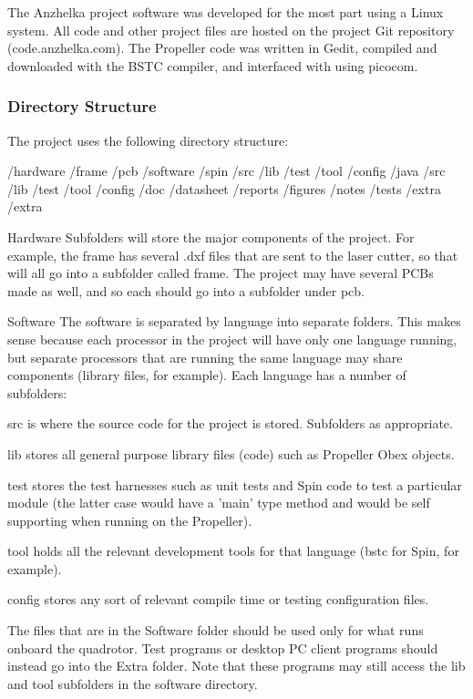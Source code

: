 \documentclass{article}
\numberwithin{equation}{section} %
\begin{document}
The Anzhelka project software was developed for the most part using a Linux system. All code and other project files are hosted on the project Git repository (code.anzhelka.com). The Propeller code was written in Gedit, compiled and downloaded with the BSTC compiler, and interfaced with using picocom.

\subsubsection{Directory Structure}

The project uses the following directory structure:

 /hardware 
    /frame 
    /pcb 
 /software 
    /spin 
       /src 
       /lib 
       /test 
       /tool 
       /config 
    /java 
       /src 
       /lib 
       /test 
       /tool 
       /config 
 /doc 
    /datasheet 
    /reports 
    /figures 
    /notes 
    /tests 
    /extra 
 /extra 
 
Hardware
Subfolders will store the major components of the project. For example, the frame has several .dxf files that are sent to the laser cutter, so that will all go into a subfolder called frame. The project may have several PCBs made as well, and so each should go into a subfolder under pcb. 

Software 
The software is separated by language into separate folders. This makes sense because each processor in the project will have only one language running, but separate processors that are running the same language may share components (library files, for example). Each language has a number of subfolders: 

\begin{list}{*}{}
	\item src is where the source code for the project is stored. Subfolders as appropriate. 
	\item lib stores all general purpose library files (code) such as Propeller Obex objects. 
	\item test stores the test harnesses such as unit tests and Spin code to test a particular module (the latter case would have a 'main' type method and would be self supporting when running on the Propeller). 
	\item tool holds all the relevant development tools for that language (bstc for Spin, for example). 
	\item config stores any sort of relevant compile time or testing configuration files. 
\end{list}
The files that are in the Software folder should be used only for what runs onboard the quadrotor. Test programs or desktop PC client programs should instead go into the Extra folder. Note that these programs may still access the lib and tool subfolders in the software directory. 
\end{document}
